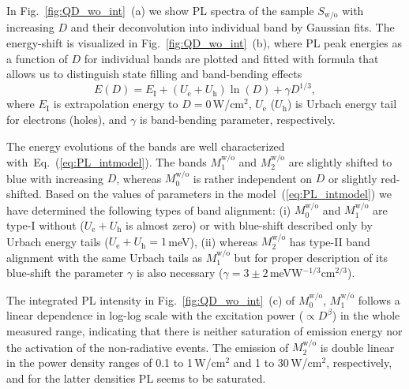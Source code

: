 In Fig.~\ref{fig:QD_wo_int}~(a) we show PL spectra of the sample $S_\mathrm{w/o}$ with increasing $D$ and their deconvolution into individual band by Gaussian fits. The energy-shift is visualized in Fig.~\ref{fig:QD_wo_int}~(b), where PL peak energies as a function of $D$ for individual bands are plotted and fitted with %
%
formula that allows us to distinguish state filling and band-bending effects~\cite{Abramkin_blueshift_analytical}
%
\begin{equation}
E(D)=E_\mathrm{I}+\left(U_\mathrm{e}+U_\mathrm{h}\right) \ln\left(D \right)+\gamma D^{1/3}, \label{eq:PL_intmodel}
\end{equation}
%
where $E_\mathrm{I}$ is extrapolation energy to $D=0$$\,$W/cm$^2$, $U_\mathrm{e}$ ($U_\mathrm{h}$) is Urbach energy tail for electrons (holes), and $\gamma$ is band-bending parameter, respectively.%

The energy evolutions of the bands are well characterized with~Eq.~(\ref{eq:PL_intmodel}). The bands $M_1^\mathrm{w/o}$ and $M_2^\mathrm{w/o}$ are slightly shifted to blue with increasing $D$, whereas $M_0^\mathrm{w/o}$ is rather independent on $D$ or slightly red-shifted. Based on the values of parameters in the model~(\ref{eq:PL_intmodel}) we have determined the following types of band alignment: (i) $M_0^\mathrm{w/o}$ and $M_1^\mathrm{w/o}$ are type-I without ($U_\mathrm{e}+U_\mathrm{h}$ is almost zero) or with blue-shift described only by Urbach energy tails ($U_\mathrm{e}+U_\mathrm{h}=1$$\,$meV), (ii) whereas $M_2^\mathrm{w/o}$ has type-II band alignment with the same Urbach tails as $M_1^\mathrm{w/o}$ but for proper description of its blue-shift the parameter $\gamma$ is also necessary ($\gamma=3\pm2$$\,$meVW$^{-1/3}$cm$^{2/3}$).


The integrated PL intensity in Fig.~\ref{fig:QD_wo_int}~(c) of $M_0^\mathrm{w/o}$, $M_1^\mathrm{w/o}$ follows a linear dependence in log-log scale with the excitation power ($\propto D^\beta$) in the whole measured range, indicating that there is neither saturation of emission energy nor the activation of the non-radiative events. The emission of $M_2^\mathrm{w/o}$ is double linear in the power density ranges of 0.1 to 1$\,$W/cm$^2$ and 1 to 30$\,$W/cm$^2$, respectively, and for the latter densities PL seems to be saturated.

